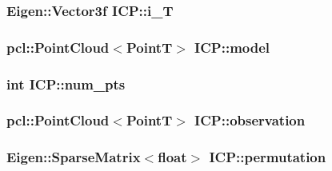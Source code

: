 \hypertarget{classICP_a63b486fc85453b0f09c6020e1c6227f4}{
\subsubsection[{i\-\_\-\-T}]{\setlength{\rightskip}{0pt plus 5cm}\-Eigen\-::\-Vector3f {\bf \-I\-C\-P\-::i\-\_\-\-T}}}\label{classICP_a63b486fc85453b0f09c6020e1c6227f4}
\hypertarget{classICP_ae224713dd84e34bbef52a011046527af}{
\subsubsection[{model}]{\setlength{\rightskip}{0pt plus 5cm}pcl\-::\-Point\-Cloud$<${\bf \-Point\-T}$>$ {\bf \-I\-C\-P\-::model}}}\label{classICP_ae224713dd84e34bbef52a011046527af}
\hypertarget{classICP_a9b8cf5129a0cb5ad3fd05b261d514bb6}{
\subsubsection[{num\-\_\-pts}]{\setlength{\rightskip}{0pt plus 5cm}int {\bf \-I\-C\-P\-::num\-\_\-pts}}}\label{classICP_a9b8cf5129a0cb5ad3fd05b261d514bb6}
\hypertarget{classICP_a92b2b3089759aad730cb92a0976aea1b}{
\subsubsection[{observation}]{\setlength{\rightskip}{0pt plus 5cm}pcl\-::\-Point\-Cloud$<${\bf \-Point\-T}$>$ {\bf \-I\-C\-P\-::observation}}}\label{classICP_a92b2b3089759aad730cb92a0976aea1b}
\hypertarget{classICP_aade0504cb0e1d5abcb2c2add2be606b1}{
\subsubsection[{permutation}]{\setlength{\rightskip}{0pt plus 5cm}\-Eigen\-::\-Sparse\-Matrix$<$float$>$ {\bf \-I\-C\-P\-::permutation}}}\label{classICP_aade0504cb0e1d5abcb2c2add2be606b1}
